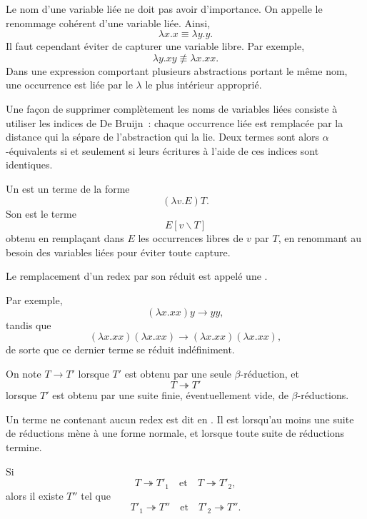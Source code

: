 \thingy Le nom d'une variable liée ne doit pas avoir d'importance.  On
appelle  le renommage
cohérent d'une variable liée.  Ainsi,
\[
\lambda x.x\equiv\lambda y.y.
\]
Il faut cependant éviter de capturer une variable libre.  Par exemple,
\[
\lambda y.xy\not\equiv\lambda x.xx.
\]
Dans une expression comportant plusieurs abstractions portant le même
nom, une occurrence est liée par le $\lambda$ le plus intérieur
approprié.

Une façon de supprimer complètement les noms de variables liées
consiste à utiliser les indices de De Bruijn : chaque occurrence liée
est remplacée par la distance qui la sépare de l'abstraction qui la
lie.  Deux termes sont alors $\alpha$-équivalents si et seulement si
leurs écritures à l'aide de ces indices sont identiques.

\begin{defn}\label{definition-beta-reduction}
Un  est un terme de la forme
\[
(\lambda v.E)T.
\]
Son  est le terme
\[
E[v\backslash T]
\]
obtenu en remplaçant dans $E$ les occurrences libres de $v$ par $T$,
en renommant au besoin des variables liées pour éviter toute capture.

Le remplacement d'un redex par son réduit est appelé une
.
\end{defn}

Par exemple,
\[
(\lambda x.xx)y\longrightarrow yy,
\]
tandis que
\[
(\lambda x.xx)(\lambda x.xx)
 \longrightarrow
(\lambda x.xx)(\lambda x.xx),
\]
de sorte que ce dernier terme se réduit indéfiniment.

On note $T\longrightarrow T'$ lorsque $T'$ est obtenu par une seule
$\beta$-réduction, et
\[
T\twoheadrightarrow T'
\]
lorsque $T'$ est obtenu par une suite finie, éventuellement vide, de
$\beta$-réductions.

Un terme ne contenant aucun redex est dit en
.  Il est
lorsqu'au moins une suite de réductions mène à une forme normale, et
 lorsque
toute suite de réductions termine.

\begin{thm}\label{church-rosser-theorem}
Si
\[
T\twoheadrightarrow T'_1
\quad\text{et}\quad
T\twoheadrightarrow T'_2,
\]
alors il existe $T''$ tel que
\[
T'_1\twoheadrightarrow T''
\quad\text{et}\quad
T'_2\twoheadrightarrow T''.
\]
\end{thm}

